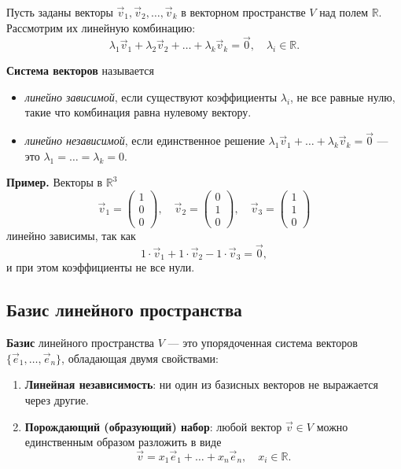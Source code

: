 Пусть заданы векторы $\vec{v}_1, \vec{v}_2, \dots, \vec{v}_k$ в векторном пространстве $V$ над полем $\mathbb{R}$. Рассмотрим их линейную комбинацию:
\[
\lambda_1 \vec{v}_1 + \lambda_2 \vec{v}_2 + \dots + \lambda_k \vec{v}_k = \vec{0}, 
\quad \lambda_i \in \mathbb{R}.
\]

\textbf{Система векторов} называется
\begin{itemize}[leftmargin=*]
  \item \textit{линейно зависимой}, если существуют коэффициенты $\lambda_i$, не все равные нулю, такие что комбинация равна нулевому вектору.
  \item \textit{линейно независимой}, если единственное решение $\lambda_1 \vec{v}_1 + \dots + \lambda_k \vec{v}_k = \vec{0}$ — это $\lambda_1 = \dots = \lambda_k = 0$.
\end{itemize}

\textbf{Пример.} Векторы в $\mathbb{R}^3$
\[
\vec{v}_1 = \begin{pmatrix}1\\0\\0\end{pmatrix},\quad
\vec{v}_2 = \begin{pmatrix}0\\1\\0\end{pmatrix},\quad
\vec{v}_3 = \begin{pmatrix}1\\1\\0\end{pmatrix}
\]
линейно зависимы, так как
\[
1\cdot \vec{v}_1 + 1\cdot \vec{v}_2 -1\cdot \vec{v}_3 = \vec{0},
\]
и при этом коэффициенты не все нули.

\subsection{Базис линейного пространства}

\textbf{Базис} линейного пространства $V$ — это упорядоченная система векторов $\{\vec{e}_1, \dots, \vec{e}_n\}$, обладающая двумя свойствами:
\begin{enumerate}[label=\arabic*)]
  \item \textbf{Линейная независимость}: ни один из базисных векторов не выражается через другие.
  \item \textbf{Порождающий (образующий) набор}: любой вектор $\vec{v}\in V$ можно единственным образом разложить в виде
    \[
      \vec{v} = x_1 \vec{e}_1 + \dots + x_n \vec{e}_n, 
      \quad x_i \in \mathbb{R}.
    \]
\end{enumerate}


